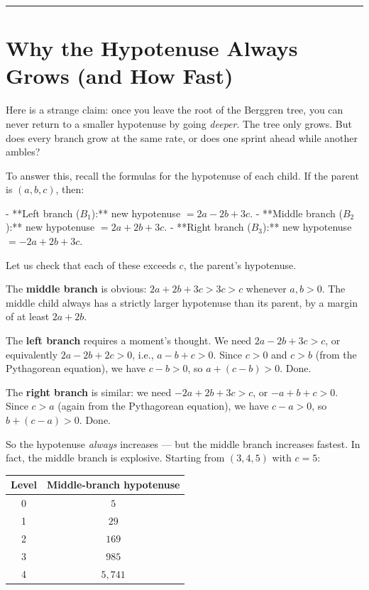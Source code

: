 \documentclass[12pt, letterpaper, openany]{book}
\theoremstyle{definition}
\theoremstyle{remark}
\begin{document}
\bigskip\noindent\rule{\textwidth}{0.4pt}\bigskip



\section*{Why the Hypotenuse Always Grows (and How Fast)}


Here is a strange claim: once you leave the root of the Berggren tree, you can never return to a smaller hypotenuse by going \textit{deeper}. The tree only grows. But does every branch grow at the same rate, or does one sprint ahead while another ambles?

To answer this, recall the formulas for the hypotenuse of each child. If the parent is $(a, b, c)$, then:

- **Left branch ($B_1$):** new hypotenuse $= 2a - 2b + 3c$.
- **Middle branch ($B_2$):** new hypotenuse $= 2a + 2b + 3c$.
- **Right branch ($B_3$):** new hypotenuse $= -2a + 2b + 3c$.

Let us check that each of these exceeds $c$, the parent's hypotenuse.

The \textbf{middle branch} is obvious: $2a + 2b + 3c > 3c > c$ whenever $a, b > 0$. The middle child always has a strictly larger hypotenuse than its parent, by a margin of at least $2a + 2b$.

The \textbf{left branch} requires a moment's thought. We need $2a - 2b + 3c > c$, or equivalently $2a - 2b + 2c > 0$, i.e., $a - b + c > 0$. Since $c > 0$ and $c > b$ (from the Pythagorean equation), we have $c - b > 0$, so $a + (c - b) > 0$. Done.

The \textbf{right branch} is similar: we need $-2a + 2b + 3c > c$, or $-a + b + c > 0$. Since $c > a$ (again from the Pythagorean equation), we have $c - a > 0$, so $b + (c - a) > 0$. Done.

So the hypotenuse \textit{always} increases --- but the middle branch increases fastest. In fact, the middle branch is explosive. Starting from $(3, 4, 5)$ with $c = 5$:


\begin{center}
\begin{tabular}{|c|c|}
\hline
Level & Middle-branch hypotenuse \\
\hline
0 & $5$ \\
1 & $29$ \\
2 & $169$ \\
3 & $985$ \\
4 & $5{,}741$ \\
\hline
\end{tabular}
\end{center}
\end{document}
